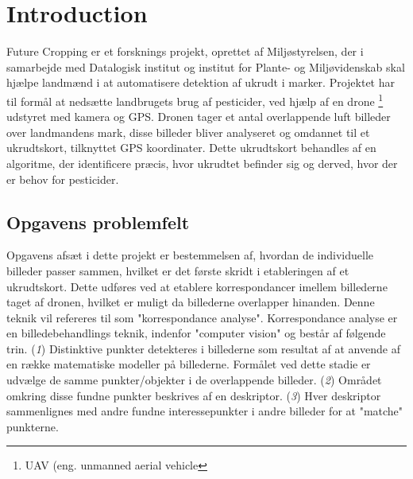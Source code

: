 \chapter{Introduction} \label{sec:intro}
Future Cropping er et forsknings projekt, oprettet af Miljøstyrelsen, der i samarbejde med Datalogisk institut og institut for Plante- og Miljøvidenskab skal hjælpe landmænd i at automatisere detektion af ukrudt i marker. Projektet har til formål at nedsætte landbrugets brug af pesticider, ved hjælp af en drone \footnote{UAV (eng. unmanned aerial vehicle} udstyret med kamera og GPS. Dronen tager et antal overlappende luft billeder over landmandens mark, disse billeder bliver analyseret og omdannet til et ukrudtskort, tilknyttet GPS koordinater.
Dette ukrudtskort behandles af en algoritme, der identificere præcis, hvor ukrudtet befinder sig og derved, hvor der er behov for pesticider\cite{drone}.
\section{Opgavens problemfelt} \label{subsec:felt}
Opgavens afsæt i dette projekt er bestemmelsen af, hvordan de individuelle billeder passer sammen, hvilket er det første skridt i etableringen af et ukrudtskort. Dette udføres ved at etablere korrespondancer imellem billederne taget af dronen, hvilket er muligt da billederne overlapper hinanden. Denne teknik vil refereres til som "korrespondance analyse". Korrespondance analyse er en billedebehandlings teknik, indenfor "computer vision" og består af følgende trin. (\textit{1}) Distinktive punkter detekteres i billederne som resultat af at anvende af en række matematiske modeller på billederne. Formålet ved dette stadie er udvælge de samme punkter/objekter i de overlappende billeder. (\textit{2}) Området omkring disse fundne punkter beskrives af en deskriptor. (\textit{3}) Hver deskriptor sammenlignes med andre fundne interessepunkter i andre billeder for at "matche" punkterne.
